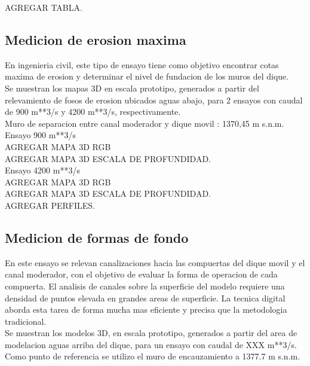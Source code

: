 AGREGAR TABLA.

\subsection{Medicion de erosion maxima}

En ingenieria civil, este tipo de ensayo tiene como objetivo encontrar cotas maxima de erosion y determinar el nivel de fundacion de los muros del dique. \\ 
Se muestran los mapas 3D en escala prototipo, generados a partir del relevamiento de fosos de erosion ubicados aguas abajo, para 2 ensayos con caudal de 900 m**3/s y 4200 m**3/s, respectivamente. \\

Muro de separacion entre canal moderador y dique movil : 1370,45 m s.n.m.\\

Ensayo 900 m**3/s \\
AGREGAR MAPA 3D RGB \\

AGREGAR MAPA 3D ESCALA DE PROFUNDIDAD.\\

Ensayo 4200 m**3/s \\
AGREGAR MAPA 3D RGB \\

AGREGAR MAPA 3D ESCALA DE PROFUNDIDAD. \\

AGREGAR PERFILES.\\


\subsection{Medicion de formas de fondo}

En este ensayo se relevan canalizaciones hacia las compuertas del dique movil y el canal moderador, con el objetivo de evaluar la forma de operacion de cada compuerta. El analisis de canales sobre la superficie del modelo requiere una densidad de puntos elevada en grandes areas de superficie. La tecnica digital aborda esta tarea de forma mucha mas eficiente y precisa que la metodologia tradicional. \\
Se muestran los modelos 3D, en escala prototipo, generados a partir del area de modelacion aguas arriba del dique, para un ensayo con caudal de XXX m**3/s.\\
Como punto de referencia se utilizo el muro de encauzamiento a 1377.7 m s.n.m.

